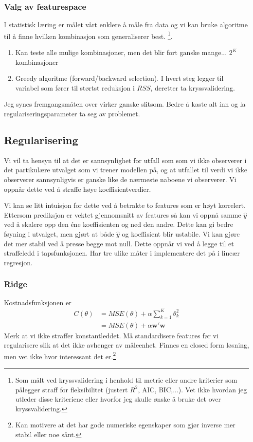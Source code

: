 \subsubsection{Valg av featurespace}
I statistisk læring er målet vårt enklere å måle fra data og vi kan bruke algoritme til å finne hvilken kombinasjon som generaliserer best. \footnote{Som målt ved kryssvalidering i henhold til metric eller andre kriterier som pålegger straff for fleksibilitet (justert $R^2$, AIC, BIC,...). Vet ikke hvordan jeg utleder disse kriteriene eller hvorfor jeg skulle ønske å bruke det over kryssvalidering.}.
\begin{enumerate}
\item Kan teste alle mulige kombinasjoner, men det blir fort ganske mange... $2^K$ kombinasjoner
\item Greedy algoritme (forward/backward selection). I hvert steg legger til variabel som fører til størtst reduksjon i $RSS$, deretter ta kryssvalidering.
\end{enumerate}
Jeg synes fremgangsmåten over virker ganske slitsom. Bedre å kaste alt inn og la regulariseringsparameter ta seg av problemet.
\subsection{Regularisering}
Vi vil ta hensyn til at det er sannsynlighet for utfall som som vi ikke observerer i det partikulære utvalget som vi trener modellen på, og at utfallet til verdi vi ikke observerer sannsynligvis er ganske like de nærmeste naboene vi observerer. Vi oppnår dette ved å straffe høye koeffisientverdier. 

Vi kan se litt intuisjon for dette ved å betrakte to features som er høyt korrelert. Ettersom prediksjon er vektet gjennomsnitt av features så kan vi oppnå samme $\hat{y}$ ved å skalere opp den éne koeffisienten og ned den andre. Dette kan gi bedre føyning i utvalget, men gjørt at både $\hat{y}$ og koeffisient blir ustabile. Vi kan gjøre det mer stabil ved å presse begge mot null. Dette oppnår vi ved å legge til et straffeledd i tapsfunksjonen. Har tre ulike måter i implementere det på i lineær regresjon.
\subsubsection{Ridge}
Kostnadsfunksjonen er 
\begin{align}
C(\theta) &= MSE(\theta)+\alpha\sum_{k=1}^K\theta_k^2 \\
&= MSE(\theta) + \alpha \mathbf{w}'\mathbf{w}
\end{align}
Merk at vi ikke straffer konstantleddet. Må standardisere features før vi regularisere slik at det ikke avhenger av måleenhet. Finnes en closed form løsning, men vet ikke hvor interessant det er.\footnote{Kan motivere at det har gode numeriske egenskaper som gjør inverse mer stabil eller noe sånt.}
